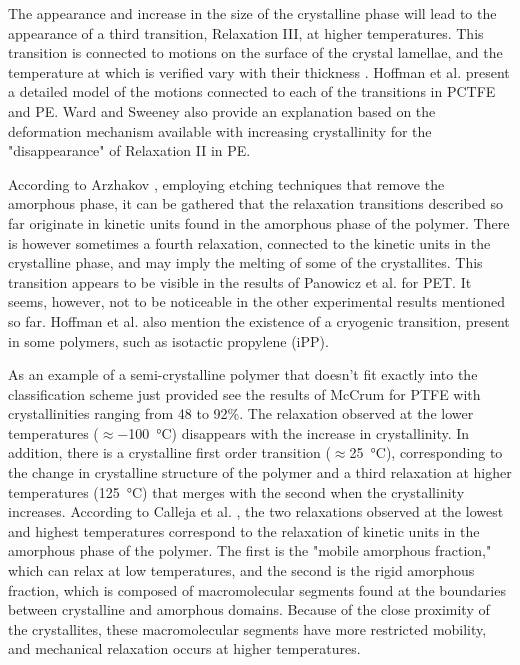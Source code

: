 The appearance and increase in the size of the crystalline phase will lead to the appearance of a third transition, Relaxation III, at higher temperatures.
This transition is connected to motions on the surface of the crystal lamellae, and the temperature at which is verified vary with their thickness \citep{khannaDynamicMechanicalRelaxations1985, hoffmanAnalysisRelaxationsPolychlorotrifluoroethylene2007}.
Hoffman et al. \citep{hoffmanAnalysisRelaxationsPolychlorotrifluoroethylene2007} present a detailed model of the motions connected to each of the transitions in PCTFE and PE.
Ward and Sweeney \citep{wardIntroductionMechanicalProperties2004} also provide an explanation based on the deformation mechanism available with increasing crystallinity for the "disappearance" of Relaxation II in PE.

According to Arzhakov \citep{arzhakovRelaxationPhysicalMechanical2019}, employing etching techniques that remove the amorphous phase, it can be gathered that the relaxation transitions described so far originate in kinetic units found in the amorphous phase of the polymer.
There is however sometimes a fourth relaxation, connected to the kinetic units in the crystalline phase, and may imply the melting of some of the crystallites.
This transition appears to be visible in the results of Panowicz et al. \citep{panowiczPropertiesPolyethyleneTerephthalate2021} for PET.
It seems, however, not to be noticeable in the other experimental results mentioned so far.
Hoffman et al. \citep{hoffmanAnalysisRelaxationsPolychlorotrifluoroethylene2007} also mention the existence of a cryogenic transition, present in some polymers, such as isotactic propylene (iPP).

As an example of a semi-crystalline polymer that doesn't fit exactly into the classification scheme just provided see the results of McCrum \cite{mccrumStudyInternalFriction1959} for PTFE with crystallinities ranging from 48 to 92\%.
The relaxation observed at the lower temperatures ($\approx$\SI{-100}{\celsius}) disappears with the increase in crystallinity.
In addition, there is a crystalline first order transition ($\approx$\SI{25}{\celsius}), corresponding to the change in crystalline structure of the polymer and a third relaxation at higher temperatures (\SI{125}{\celsius}) that merges with the second when the crystallinity increases.
According to Calleja et al. \citep{callejaWhereGlassTransition2013}, the two relaxations observed at the lowest and highest temperatures correspond to the relaxation of kinetic units in the amorphous phase of the polymer.
The first is the "mobile amorphous fraction," which can relax at low temperatures, and the second is the rigid amorphous fraction, which is composed of macromolecular segments found at the boundaries between crystalline and amorphous domains.
Because of the close proximity of the crystallites, these macromolecular segments have more restricted mobility, and mechanical relaxation occurs at higher temperatures.

